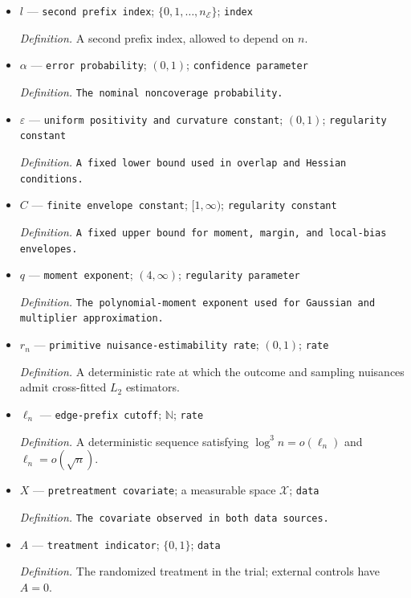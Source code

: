 \documentclass{article}
\begin{document}
\begin{itemize}
  \item \(l\) --- \texttt{second prefix index}; \(\{0,1,\ldots,n_{\mathcal E}\}\); \texttt{index}
  \par\smallskip\noindent\emph{Definition.} A second prefix index, allowed to depend on \(n\).
  \item \(\alpha\) --- \texttt{error probability}; \((0,1)\); \texttt{confidence parameter}
  \par\smallskip\noindent\emph{Definition.} \texttt{The nominal noncoverage probability.}
  \item \(\varepsilon\) --- \texttt{uniform positivity and curvature constant}; \((0,1)\); \texttt{regularity constant}
  \par\smallskip\noindent\emph{Definition.} \texttt{A fixed lower bound used in overlap and Hessian conditions.}
  \item \(C\) --- \texttt{finite envelope constant}; \([1,\infty)\); \texttt{regularity constant}
  \par\smallskip\noindent\emph{Definition.} \texttt{A fixed upper bound for moment,\allowbreak{} margin,\allowbreak{} and local-\allowbreak{}bias envelopes.}
  \item \(q\) --- \texttt{moment exponent}; \((4,\infty)\); \texttt{regularity parameter}
  \par\smallskip\noindent\emph{Definition.} \texttt{The polynomial-\allowbreak{}moment exponent used for Gaussian and multiplier approximation.}
  \item \(r_n\) --- \texttt{primitive nuisance-\allowbreak{}estimability rate}; \((0,1)\); \texttt{rate}
  \par\smallskip\noindent\emph{Definition.} A deterministic rate at which the outcome and sampling nuisances admit cross-fitted \(L_2\) estimators.
  \item \(\ell_n\) --- \texttt{edge-\allowbreak{}prefix cutoff}; \(\mathbb N\); \texttt{rate}
  \par\smallskip\noindent\emph{Definition.} A deterministic sequence satisfying \(\log^3 n=o(\ell_n)\) and \(\ell_n=o(\sqrt n)\).
  \item \(X\) --- \texttt{pretreatment covariate}; a measurable space \(\mathcal X\); \texttt{data}
  \par\smallskip\noindent\emph{Definition.} \texttt{The covariate observed in both data sources.}
  \item \(A\) --- \texttt{treatment indicator}; \(\{0,1\}\); \texttt{data}
  \par\smallskip\noindent\emph{Definition.} The randomized treatment in the trial; external controls have \(A=0\).

\end{itemize}
\end{document}
